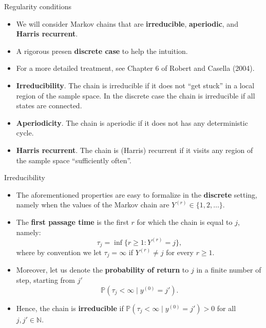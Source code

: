 \documentclass[
  9pt,
  ignorenonframetext,
]{beamer}
\begin{document}
\begin{frame}{Regularity conditions}
\protect\hypertarget{regularity-conditions}{}
\begin{itemize}
\item
  We will consider Markov chains that are \textbf{irreducible},
  \textbf{aperiodic}, and \textbf{Harris recurrent}.
\item
  A rigorous presen \textbf{discrete case} to help the intuition.
\item
  For a more detailed treatment, see Chapter 6 of Robert and Casella
  (2004).
\item
  \textbf{Irreducibility}. The chain is irreducible if it does not ``get
  stuck'' in a local region of the sample space. In the discrete case
  the chain is irreducible if all states are connected.
\item
  \textbf{Aperiodicity}. The chain is aperiodic if it does not has any
  deterministic cycle.
\item
  \textbf{Harris recurrent}. The chain is (Harris) recurrent if it
  visits any region of the sample space ``sufficiently often''.
\end{itemize}
\end{frame}

\begin{frame}{Irreducibility}
\protect\hypertarget{irreducibility}{}
\begin{itemize}
\item
  The aforementioned properties are easy to formalize in the
  \textbf{discrete} setting, namely when the values of the Markov chain
  are \(Y^{(r)} \in \{1, 2,\dots\}\).
\item
  The \textbf{first passage time} is the first \(r\) for which the chain
  is equal to \(j\), namely: \[
  \tau_j = \inf\{r \ge 1 : Y^{(r)} = j\},
  \] where by convention we let \(\tau_j = \infty\) if
  \(Y^{(r)} \neq j\) for every \(r \ge 1\).
\item
  Moreover, let us denote the \textbf{probability of return} to \(j\) in
  a finite number of step, starting from \(j'\) \[
  \mathbb{P}(\tau_j < \infty \mid y^{(0)} = j').
  \]
\item
  Hence, the chain is \textbf{irreducible} if
  \(\mathbb{P}(\tau_j < \infty \mid y^{(0)} = j') > 0\) for all
  \(j, j' \in \mathbb{N}\).
\end{itemize}
\end{frame}
\end{document}
